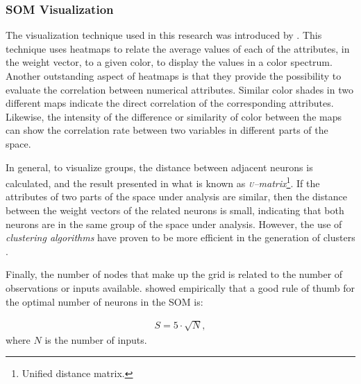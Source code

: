 \documentclass[5p,authoryear,preprint,12pt]{elsarticle}
\begin{document}

\subsubsection{SOM Visualization}\hspace{1cm}

The visualization technique used in this research was introduced by \citet{ultsch1990kohonen}. This technique uses heatmaps to relate the average values of each of the attributes, in the weight vector, to a given color, to display the values in a color spectrum. Another outstanding aspect of heatmaps is that they provide the possibility to evaluate the correlation between numerical attributes. Similar color shades in two different maps indicate the direct correlation of the corresponding attributes. Likewise, the intensity of the difference or similarity of color between the maps can show the correlation rate between two variables in different parts of the space.

In general, to visualize groups, the distance between adjacent neurons is calculated, and the result presented in what is known as \emph{\textsc{u}--matrix}\footnote{Unified distance matrix.}. If the attributes of two parts of the space under analysis are similar, then the distance between the weight vectors of the related neurons is small, indicating that both neurons are in the same group of the space under analysis. However, the use of \textit{clustering algorithms} have proven to be more efficient in the generation of clusters \citep{kohonen2013essentials}.

Finally, the number of nodes that make up the grid is related to the number of observations or inputs available. \citet{vesanto2000clustering} showed empirically that a good rule of thumb for the optimal number of neurons in the SOM is:

\begin{eqnarray}\label{size_som}
S=5\cdot\sqrt{N},
\end{eqnarray}
where $N$ is the number of inputs.
\end{document}
